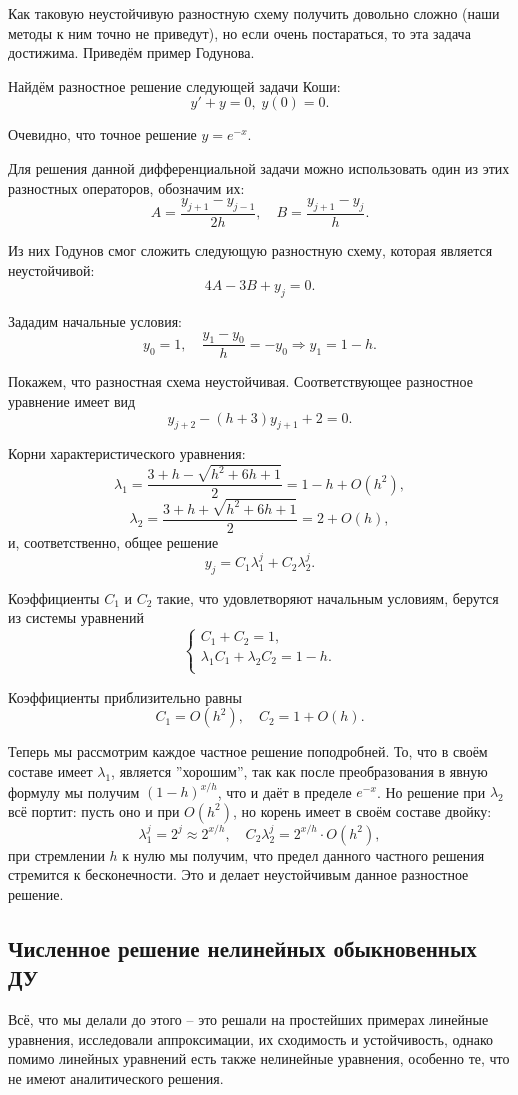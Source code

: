 \documentclass[../main.tex]{subfile}
\begin{document}
Как таковую неустойчивую разностную схему получить довольно сложно (наши методы
к ним точно не приведут), но если очень постараться, то эта задача достижима.
Приведём пример Годунова.

\begin{example}
	Найдём разностное решение следующей задачи Коши:
	\[y'+y=0,\;y(0)=0.\]

	Очевидно, что точное решение $y=e^{-x}$.

	Для решения данной дифференциальной задачи можно использовать один из
	этих разностных операторов, обозначим их:
	\[A=\frac{y_{j+1}-y_{j-1}}{2h},\quad B=\frac{y_{j+1}-y_j}{h}.\]

	Из них Годунов смог сложить следующую разностную схему, которая является
	неустойчивой:
	\[4A-3B+y_j=0.\]

	Зададим начальные условия:
	\[y_0=1,\quad\frac{y_1-y_0}{h}=-y_0\Rightarrow y_1=1-h.\]

	Покажем, что разностная схема неустойчивая.
	Соответствующее разностное уравнение имеет вид
	\[y_{j+2}-(h+3)y_{j+1}+2=0.\]

	Корни характеристического уравнения:
	\[\lambda_1=\frac{3+h-\sqrt{h^2+6h+1}}{2}=1-h+O(h^2),\]
	\[\lambda_2=\frac{3+h+\sqrt{h^2+6h+1}}{2}=2+O(h),\]
	и, соответственно, общее решение
	\[y_j=C_1\lambda_1^j+C_2\lambda_2^j.\]

	Коэффициенты $C_1$ и $C_2$ такие, что удовлетворяют начальным условиям,
	берутся из системы уравнений
	\[
		\begin{cases}
			C_1+C_2=1, \\
			\lambda_1C_1+\lambda_2C_2=1-h. \\
		\end{cases}
	\]

	Коэффициенты приблизительно равны
	\[C_1=O(h^2),\quad C_2=1+O(h).\]

	Теперь мы рассмотрим каждое частное решение поподробней. То, что в своём
	составе имеет $\lambda_1$, является ''хорошим'', так как после
	преобразования в явную формулу мы получим $(1-h)^{x/h}$, что и даёт в
	пределе $e^{-x}$. Но решение при $\lambda_2$ всё портит: пусть оно и при
	$O(h^2)$, но корень имеет в своём составе двойку:
	\[\lambda_1^j=2^j\approx 2^{x/h},\quad C_2\lambda_2^j=2^{x/h}\cdot
	O(h^2),\]
	при стремлении $h$ к нулю мы получим, что предел данного частного
	решения стремится к бесконечности. Это и делает неустойчивым данное
	разностное решение.
\end{example}

\subsection{Численное решение нелинейных обыкновенных ДУ}
Всё, что мы делали до этого -- это решали на простейших примерах линейные
уравнения, исследовали аппроксимации, их сходимость и устойчивость, однако
помимо линейных уравнений есть также нелинейные уравнения, особенно те, что не
имеют аналитического решения.
\end{document}
